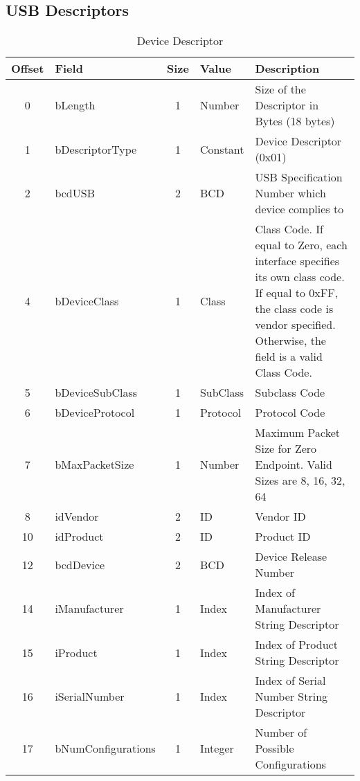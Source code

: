 \begin{appendices}

\section*{USB Descriptors}
\label{appendix:descriptors}

\begin{table}[h]
\centering
\label{tab:usb_descriptor}
\begin{tabular}{|c|l|c|l|p{8cm}|}
\hline
\textbf{Offset} & \textbf{Field} & \textbf{Size} & \textbf{Value} & \textbf{Description} \\ \hline
0 & bLength & 1 & Number & Size of the Descriptor in Bytes (18 bytes) \\ \hline
1 & bDescriptorType & 1 & Constant & Device Descriptor (0x01) \\ \hline
2 & bcdUSB & 2 & BCD & USB Specification Number which device complies to \\ \hline
4 & bDeviceClass & 1 & Class & Class Code. If equal to Zero, each interface specifies its own class code. If equal to 0xFF, the class code is vendor specified. Otherwise, the field is a valid Class Code. \\ \hline
5 & bDeviceSubClass & 1 & SubClass & Subclass Code \\ \hline
6 & bDeviceProtocol & 1 & Protocol & Protocol Code \\ \hline
7 & bMaxPacketSize & 1 & Number & Maximum Packet Size for Zero Endpoint. Valid Sizes are 8, 16, 32, 64 \\ \hline
8 & idVendor & 2 & ID & Vendor ID \\ \hline
10 & idProduct & 2 & ID & Product ID \\ \hline
12 & bcdDevice & 2 & BCD & Device Release Number \\ \hline
14 & iManufacturer & 1 & Index & Index of Manufacturer String Descriptor \\ \hline
15 & iProduct & 1 & Index & Index of Product String Descriptor \\ \hline
16 & iSerialNumber & 1 & Index & Index of Serial Number String Descriptor \\ \hline
17 & bNumConfigurations & 1 & Integer & Number of Possible Configurations \\ \hline
\end{tabular}
\caption{Device Descriptor}
\end{table}


\end{appendices}
